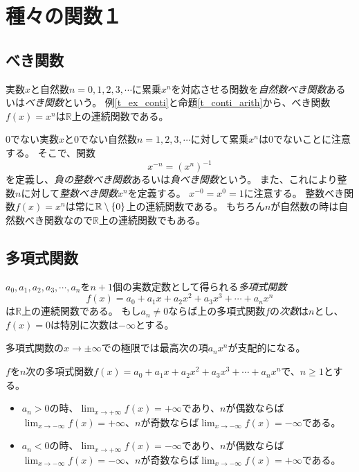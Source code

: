 
\chapter{種々の関数１}

\section{べき関数}

実数$x$と自然数$n = 0, 1, 2, 3, \cdots$に累乗$x^n$を対応させる関数を\emph{自然数べき関数}あるいは\emph{べき関数}という。
例\ref{t_ex_conti}と命題\ref{t_conti_arith}から、べき関数$f(x) = x^n$は$\mathbb{R}$上の連続関数である。

$0$でない実数$x$と$0$でない自然数$n = 1, 2, 3, \cdots$に対して累乗$x^n$は$0$でないことに注意する。
そこで、関数
$$
x^{-n} = (x^n)^{-1}
$$
を定義し、\emph{負の整数べき関数}あるいは\emph{負べき関数}という。
また、これにより整数$n$に対して\emph{整数べき関数}$x^n$を定義する。
$x^{-0} = x^0 = 1$に注意する。
整数べき関数$f(x) = x^n$は常に$\mathbb{R}\setminus\{0\}$上の連続関数である。
もちろん$n$が自然数の時は自然数べき関数なので$\mathbb{R}$上の連続関数でもある。

\section{多項式関数}

$a_0, a_1, a_2, a_3, \cdots, a_n$を$n+1$個の実数定数として得られる\emph{多項式関数}
$$
f(x) = a_0+a_1 x+a_2 x^2+a_3 x^3+\cdots+a_n x^n
$$
は$\mathbb{R}$上の連続関数である。
もし$a_n \ne 0$ならば上の多項式関数$f$の\emph{次数}は$n$とし、$f(x) = 0$は特別に次数は$-\infty$とする。

多項式関数の$x \to \pm\infty$での極限では最高次の項$a_n x^n$が支配的になる。

\begin{proposition}[多項式関数の無限大での極限]
$f$を$n$次の多項式関数$f(x) = a_0+a_1 x+a_2 x^2+a_3 x^3+\cdots+a_n x^n$で、$n \ge 1$とする。
\begin{itemize}
\item
$a_n > 0$の時、$\lim_{x \to +\infty}f(x) = +\infty$であり、$n$が偶数ならば$\lim_{x \to -\infty}f(x) = +\infty$、$n$が奇数ならば$\lim_{x \to -\infty}f(x) = -\infty$である。
\item
$a_n < 0$の時、$\lim_{x \to +\infty}f(x) = -\infty$であり、$n$が偶数ならば$\lim_{x \to -\infty}f(x) = -\infty$、$n$が奇数ならば$\lim_{x \to -\infty}f(x) = +\infty$である。
\end{itemize}
\end{proposition}

